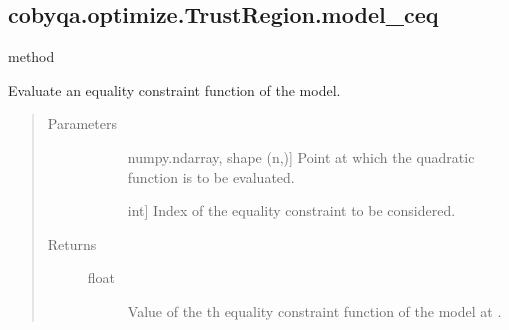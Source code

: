 \documentclass[letterpaper,10pt,english]{sphinxmanual}
\begin{document}
\begin{fulllineitems}
\begin{fulllineitems}
\begin{quote}
\begin{description}
\end{description}\end{quote}

\end{fulllineitems}



\subsection{cobyqa.optimize.TrustRegion.model\_ceq}
\label{\detokenize{refs/generated/cobyqa.optimize.TrustRegion.model_ceq:cobyqa-optimize-trustregion-model-ceq}}\label{\detokenize{refs/generated/cobyqa.optimize.TrustRegion.model_ceq::doc}}
\sphinxAtStartPar
method

\begin{fulllineitems}
\label{\detokenize{refs/generated/cobyqa.optimize.TrustRegion.model_ceq:cobyqa.optimize.TrustRegion.model_ceq}}
\sphinxAtStartPar
Evaluate an equality constraint function of the model.
\begin{quote}\begin{description}
\item[{Parameters}] \leavevmode\begin{description}
\item[{}] \leavevmode{[}numpy.ndarray, shape (n,){]}
\sphinxAtStartPar
Point at which the quadratic function is to be evaluated.

\item[{}] \leavevmode{[}int{]}
\sphinxAtStartPar
Index of the equality constraint to be considered.

\end{description}

\item[{Returns}] \leavevmode\begin{description}
\item[{float}] \leavevmode
\sphinxAtStartPar
Value of the \sphinxhyphen{}th equality constraint function of the model at
.

\end{description}

\end{description}\end{quote}


\end{fulllineitems}
\end{fulllineitems}
\end{document}
